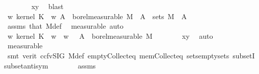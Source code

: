 \begin{isabellebody}
\ \ \ \ \ \ \isamarkupfalse%
\ xy\ \isamarkupfalse%
\ blast\isanewline
\ \ \ \ \isamarkupfalse%
\ \isamarkupfalse%
\ {\isachardoublequoteopen}{\isacharparenleft}{\kern0pt}{\isasymlambda}w{\isachardot}{\kern0pt}\ kernel\ K\ {\isacharparenleft}{\kern0pt}{\isasymomega}\ w{\isacharparenright}{\kern0pt}\ A{\isacharprime}{\kern0pt}{\isacharparenright}{\kern0pt}\ {\isasymin}\ borel{\isacharunderscore}{\kern0pt}measurable\ M{}{\isachardoublequoteclose}\ \ {\isachardoublequoteopen}A{\isacharprime}{\kern0pt}\ {\isasymin}\ sets\ M{}{\isachardoublequoteclose}\ \ A{\isacharprime}{\kern0pt}\isanewline
\ \ \ \ \ \ \isamarkupfalse%
\ assms\ that\ M{}{\isacharunderscore}{\kern0pt}def\ \isamarkupfalse%
\ {\isacharparenleft}{\kern0pt}measurable{\isacharcomma}{\kern0pt}\ auto{\isacharparenright}{\kern0pt}\isanewline
\ \ \ \ \isamarkupfalse%
\ \isamarkupfalse%
\ {\isachardoublequoteopen}{\isacharparenleft}{\kern0pt}{\isasymlambda}w{\isachardot}{\kern0pt}\ kernel\ K\ {\isacharparenleft}{\kern0pt}{\isasymomega}\ w{\isacharparenright}{\kern0pt}\ {\isacharbraceleft}{\kern0pt}{\isasymomega}\ {\isacharparenleft}{\kern0pt}w{\isacharcomma}{\kern0pt}\ {\isasymomega}\ {\isasymin}\ A{\isacharbraceright}{\kern0pt}{\isacharparenright}{\kern0pt}\ {\isasymin}\ borel{\isacharunderscore}{\kern0pt}measurable\ M{}{\isachardoublequoteclose}\isanewline
\ \ \ \ \ \ \isamarkupfalse%
\ xy\ \isamarkupfalse%
\ auto\isanewline
\ \ \ \ \ \ \isamarkupfalse%
\ measurable\isanewline
\ \ \ \ \ \ \ \ \isamarkupfalse%
\ {\isacharparenleft}{\kern0pt}smt\ {\isacharparenleft}{\kern0pt}verit{\isacharcomma}{\kern0pt}\ ccfv{\isacharunderscore}{\kern0pt}SIG{\isacharparenright}{\kern0pt}\ M{}{\isacharunderscore}{\kern0pt}def\ empty{\isacharunderscore}{\kern0pt}Collect{\isacharunderscore}{\kern0pt}eq\ mem{\isacharunderscore}{\kern0pt}Collect{\isacharunderscore}{\kern0pt}eq\ sets{\isachardot}{\kern0pt}empty{\isacharunderscore}{\kern0pt}sets\ subsetI\ subset{\isacharunderscore}{\kern0pt}antisym{\isacharparenright}{\kern0pt}\isanewline
\ \ \ \ \ \ \isamarkupfalse%
\ assms{\isacharparenleft}{\kern0pt}{}{\isacharcomma}{\kern0pt}{}{\isacharparenright}{\kern0pt}\ \isamarkupfalse%

\end{isabellebody}
